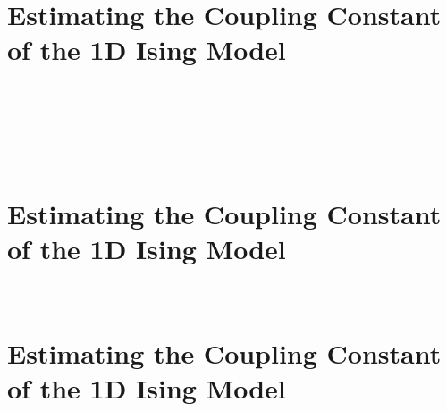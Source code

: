 \documentclass[11pt]{article}
\begin{document}
    \begin{center}
    \end{center}
    { \hspace*{\fill} \\}
    
\newpage
\hypertarget{estimating-the-coupling-constant-of-the-1d-ising-model}{%
\section*{Estimating the Coupling Constant of the 1D Ising
Model}\label{estimating-the-coupling-constant-of-the-1d-ising-model5}}
    \begin{center}
    \end{center}
    { \hspace*{\fill} \\}
    
    \begin{center}
    \end{center}
    { \hspace*{\fill} \\}
    
    \begin{center}
    \end{center}
    { \hspace*{\fill} \\}
    
\newpage
\hypertarget{estimating-the-coupling-constant-of-the-1d-ising-model}{%
\section*{Estimating the Coupling Constant of the 1D Ising
Model}\label{estimating-the-coupling-constant-of-the-1d-ising-model6}}
    \begin{center}
    \end{center}
    { \hspace*{\fill} \\}

\newpage
\hypertarget{estimating-the-coupling-constant-of-the-1d-ising-model}{%
\section*{Estimating the Coupling Constant of the 1D Ising
Model}\label{estimating-the-coupling-constant-of-the-1d-ising-model7}}
    \begin{center}
    \end{center}
    { \hspace*{\fill} \\}
   
\end{document}
